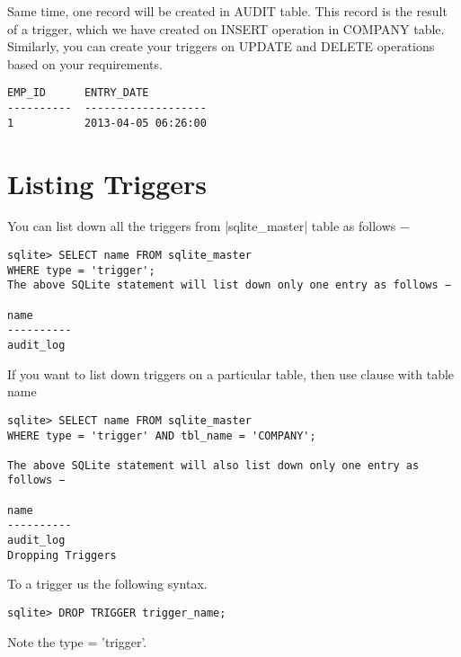 Same time, one record will be created in AUDIT table. This record is the result of a trigger, which we have created on INSERT operation in COMPANY table. Similarly, you can create your triggers on UPDATE and DELETE operations based on your requirements.

\begin{verbatim}
EMP_ID      ENTRY_DATE
----------  -------------------
1           2013-04-05 06:26:00
\end{verbatim}

\section{Listing Triggers}

You can list down all the triggers from |sqlite_master| table as follows −

\begin{verbatim}
sqlite> SELECT name FROM sqlite_master
WHERE type = 'trigger';
The above SQLite statement will list down only one entry as follows −

name
----------
audit_log
\end{verbatim}


If you want to list down triggers on a particular table, then use  clause with table name

\begin{verbatim}
sqlite> SELECT name FROM sqlite_master
WHERE type = 'trigger' AND tbl_name = 'COMPANY';

The above SQLite statement will also list down only one entry as follows −

name
----------
audit_log
Dropping Triggers
\end{verbatim}


To  a trigger us the following syntax.

\begin{verbatim}
sqlite> DROP TRIGGER trigger_name;
\end{verbatim}

Note the type = 'trigger'. 




